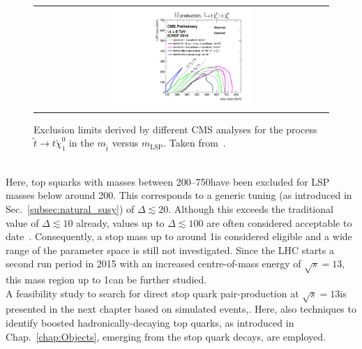 \begin{figure}[!t]
  \centering
  \begin{tabular}{c}
                \includegraphics[width=0.49\textwidth]{figures/T2tt_ICHEP2014_All.pdf} 
  \end{tabular}
\caption{Exclusion limits derived by different CMS analyses for the process $\tilde{t} \rightarrow t\tilde{\chi}_1^0$ in the $m_{\tilde{t}}$ versus $m_\mathrm{LSP}$. Taken from~\cite{bib:CMS:PhysicsResultsSUS}.} 
  \label{fig:8TeV_stop_limits}
\end{figure}
\\
Here, top squarks with masses between 200--750\gev have been excluded for LSP masses below around 200\gev. This corresponds to a generic tuning (as introduced in Sec.~\ref{subsec:natural_susy}) of $\Delta \lesssim 20$. Although this exceeds the traditional value of $\Delta \lesssim 10$ already, values up to $\Delta \lesssim 100$ are often considered acceptable to date~\cite{Craig:2013cxa}. Consequently, a stop mass up to around 1\tev is considered eligible and a wide range of the parameter space is still not investigated. Since the LHC starts a second run period in 2015 with an increased centre-of-mass energy of $\sqrt{s} = 13$\tev, this mass region up to 1\tev can be further studied.\\
A feasibility study to search for direct stop quark pair-production at $\sqrt{s} = 13$\tev is presented in the next chapter based on simulated events,. Here, also techniques to identify boosted hadronically-decaying top quarks, as introduced in Chap.~\ref{chap:Objects}, emerging from the stop quark decays, are employed.
